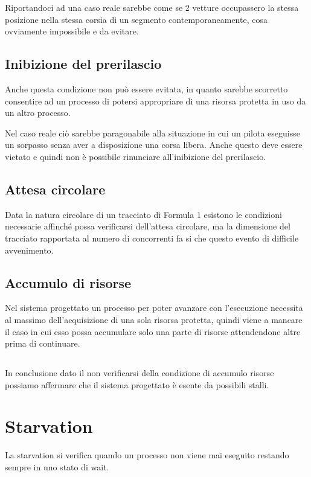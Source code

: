 \documentclass[a4paper,11pt, twoside]{book}
\begin{document}
	Riportandoci ad una caso reale sarebbe come se 2 vetture occupassero la stessa posizione nella stessa
	corsia di un segmento contemporaneamente,
	cosa ovviamente impossibile e da evitare.
	
      \subsection{Inibizione del prerilascio}
        Anche questa condizione non può essere evitata, in quanto sarebbe scorretto consentire ad un processo
	di potersi appropriare di una risorsa protetta in uso da un altro processo.
	
	Nel caso reale ciò sarebbe paragonabile alla situazione in cui un pilota eseguisse un sorpasso
	senza aver a disposizione una corsa libera. Anche questo deve essere vietato e quindi
	non è possibile rinunciare all'inibizione del prerilascio.
	
      \subsection{Attesa circolare}
        Data la natura circolare di un tracciato di Formula 1 esistono le condizioni necessarie affinché possa verificarsi 
	dell'attesa circolare, ma la dimensione del tracciato rapportata al numero di concorrenti fa si che questo 
	evento di difficile avvenimento.
	
      \subsection{Accumulo di risorse}
        Nel sistema progettato un processo per poter avanzare con l'esecuzione necessita
	al massimo dell'acquisizione di una sola risorsa protetta, quindi viene a mancare il caso in cui esso possa accumulare
	solo una parte di risorse attendendone altre prima di continuare.
      
      \subsection*{}
	In conclusione dato il non verificarsi della condizione di accumulo risorse possiamo affermare che il sistema
	progettato è esente da possibili stalli.    
    
    \section{Starvation}
      La starvation si verifica quando un processo non viene mai eseguito restando sempre in uno stato di wait.
      
\end{document}
